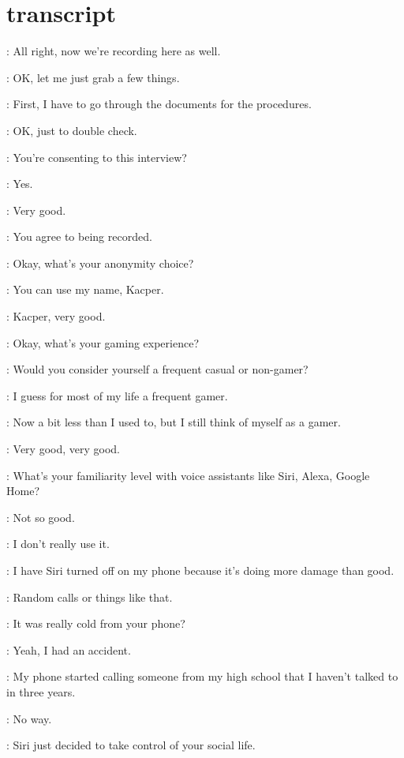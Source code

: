 
\section{transcript}

\Gabriel: All right, now we're recording here as well.

\Gabriel: OK, let me just grab a few things.

\Gabriel: First, I have to go through the documents for the procedures.

\Gabriel: OK, just to double check.

\Gabriel: You're consenting to this interview?

\Gabriel: Yes.

\Gabriel: Very good.

\Gabriel: You agree to being recorded.

\Gabriel: Okay, what's your anonymity choice?

\Gabriel: You can use my name, Kacper.

\Gabriel: Kacper, very good.

\Gabriel: Okay, what's your gaming experience?

\Gabriel: Would you consider yourself a frequent casual or non-gamer?

\Kacper: I guess for most of my life a frequent gamer.

\Kacper: Now a bit less than I used to, but I still think of myself as a gamer.

\Gabriel: Very good, very good.

\Gabriel: What's your familiarity level with voice assistants like Siri, Alexa, Google Home?

\Kacper: Not so good.

\Kacper: I don't really use it.

\Kacper: I have Siri turned off on my phone because it's doing more damage than good.

\Kacper: Random calls or things like that.

\Kacper: It was really cold from your phone?

\Kacper: Yeah, I had an accident.

\Kacper: My phone started calling someone from my high school that I haven't talked to in three years.

\Kacper: No way.

\Gabriel: Siri just decided to take control of your social life.

